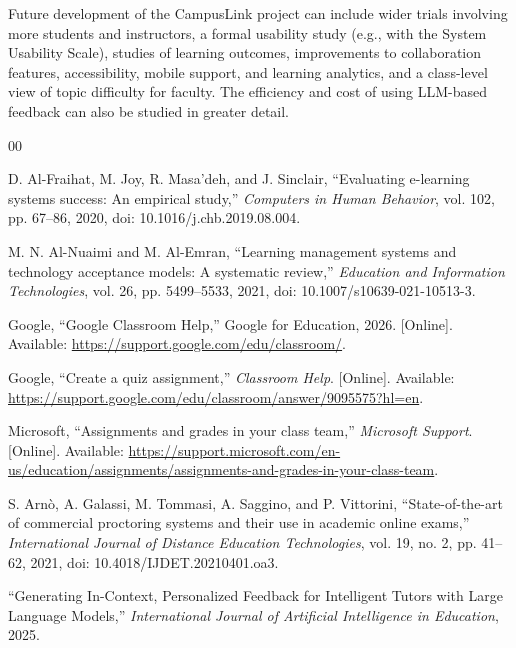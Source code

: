 \documentclass[conference]{IEEEtran}
\begin{document}
Future development of the CampusLink project can include wider trials involving more students and instructors, a formal usability study (e.g., with the System Usability Scale), studies of learning outcomes, improvements to collaboration features, accessibility, mobile support, and learning analytics, and a class-level view of topic difficulty for faculty. The efficiency and cost of using LLM-based feedback can also be studied in greater detail.

\begin{thebibliography}{00}

D. Al-Fraihat, M. Joy, R. Masa'deh, and J. Sinclair,
``Evaluating e-learning systems success: An empirical study,''
\emph{Computers in Human Behavior}, vol. 102, pp. 67--86, 2020,
doi: 10.1016/j.chb.2019.08.004.

M. N. Al-Nuaimi and M. Al-Emran,
``Learning management systems and technology acceptance models: A systematic review,''
\emph{Education and Information Technologies}, vol. 26,
pp. 5499--5533, 2021,
doi: 10.1007/s10639-021-10513-3.

Google,
``Google Classroom Help,''
Google for Education, 2026. [Online]. Available:
\url{https://support.google.com/edu/classroom/}.

Google,
``Create a quiz assignment,''
\emph{Classroom Help}. [Online]. Available:
\url{https://support.google.com/edu/classroom/answer/9095575?hl=en}.

Microsoft,
``Assignments and grades in your class team,''
\emph{Microsoft Support}. [Online]. Available:
\url{https://support.microsoft.com/en-us/education/assignments/assignments-and-grades-in-your-class-team}.

S. Arn\`o, A. Galassi, M. Tommasi, A. Saggino, and P. Vittorini,
``State-of-the-art of commercial proctoring systems and their use in
academic online exams,''
\emph{International Journal of Distance Education Technologies},
vol. 19, no. 2, pp. 41--62, 2021,
doi: 10.4018/IJDET.20210401.oa3.

``Generating In-Context, Personalized Feedback for Intelligent Tutors
with Large Language Models,''
\emph{International Journal of Artificial Intelligence in Education}, 2025.


\end{thebibliography}
\end{document}
